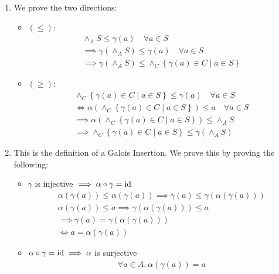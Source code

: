 \begin{exercise}
\begin{enumerate}[(1)]
        \item We prove the two directions:
        \begin{itemize}
            \item $(\leq)$:
            \begin{gather*}
                \wedge_A S \leq \gamma(a) \quad \forall a \in S \\
                \implies \gamma(\wedge_A S) \leq \gamma(a) \quad \forall a \in S \\
                \implies \gamma(\wedge_A S) \leq \wedge_C \left\{\gamma(a) \in C \mid a \in S\right\}
            \end{gather*}
            \item $(\geq)$:
            \begin{gather*}
                \wedge_C \left\{\gamma(a) \in C \mid a \in S\right\} \leq \gamma(a) \quad \forall a \in S \\
                \iff \alpha(\wedge_C \left\{\gamma(a) \in C \mid a \in S\right\}) \leq a \quad \forall a \in S \\
                \implies \alpha(\wedge_C \left\{\gamma(a) \in C \mid a \in S\right\}) \leq \wedge_A S \\
                \implies \wedge_C \left\{\gamma(a) \in C \mid a \in S\right\} \leq \gamma(\wedge_A S)
            \end{gather*}
        \end{itemize}
        \item This is the definition of a Galois Insertion. We prove this by proving the following:
        \begin{itemize}
            \item $\gamma$ is injective $\implies \alpha \circ \gamma = \operatorname{id}$
            \begin{gather*}
                \alpha(\gamma(a)) \leq \alpha(\gamma(a))
                \implies \gamma(a) \leq \gamma(\alpha(\gamma(a))) \\
                \alpha(\gamma(a)) \leq a
                \implies \gamma(\alpha(\gamma(a))) \leq a \\
                \implies \gamma(a) = \gamma(\alpha(\gamma(a))) \\
                \iff a = \alpha(\gamma(a))
            \end{gather*}
            \item $\alpha \circ \gamma = \operatorname{id} \implies \alpha$ is surjective
            \begin{gather*}
                \forall a \in A.\ \alpha(\gamma(a)) = a \\

\end{gather*}
\end{itemize}
\end{enumerate}
\end{exercise}
